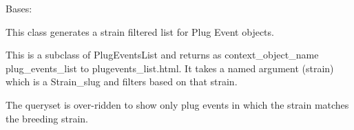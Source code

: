 \documentclass[letterpaper,10pt,english]{sphinxmanual}
\begin{document}
\begin{fulllineitems}
\label{api:mousedb.timed_mating.views.PlugEventsListStrain}
Bases: {\hyperref[api:mousedb.timed_mating.views.PlugEventsList]{}}

This class generates a strain filtered list for Plug Event objects.

This is a subclass of PlugEventsList and returns as context\_object\_name plug\_events\_list to plugevents\_list.html.
It takes a named argument (strain) which is a Strain\_slug and filters based on that strain.

\begin{fulllineitems}
\label{api:mousedb.timed_mating.views.PlugEventsListStrain.get_queryset}
The queryset is over-ridden to show only plug events in which the strain matches the breeding strain.

\end{fulllineitems}


\end{fulllineitems}

\end{document}
